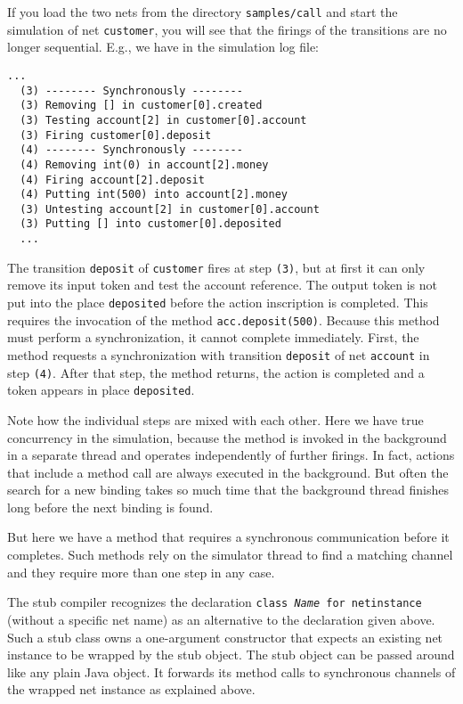 
If you load the two nets from the directory \texttt{samples/call}
and start the simulation of net
\texttt{customer}, you will see that the firings
of the transitions are no longer sequential. E.g., we have in the
simulation log file:
\begin{lstlisting}[style=xnonfloating]
  ...
  (3) -------- Synchronously --------
  (3) Removing [] in customer[0].created
  (3) Testing account[2] in customer[0].account
  (3) Firing customer[0].deposit
  (4) -------- Synchronously --------
  (4) Removing int(0) in account[2].money
  (4) Firing account[2].deposit
  (4) Putting int(500) into account[2].money
  (3) Untesting account[2] in customer[0].account
  (3) Putting [] into customer[0].deposited
  ...
\end{lstlisting}
The transition \texttt{deposit} of \texttt{customer} fires at
step \texttt{(3)}, but at first it can only remove its input token
and test the account reference. The output token is not put into the
place \texttt{deposited}
before the action inscription is completed. This requires
the invocation of the method \texttt{acc.deposit(500)}. Because
this method must perform a synchronization, it cannot complete
immediately. First, the method requests a synchronization
with transition \texttt{deposit} of net \texttt{account}
in step \texttt{(4)}. After that step, the method returns,
the action is completed and a token appears in place
\texttt{deposited}.

Note how the individual steps are mixed with each other.
Here we have true concurrency in the simulation, because the
method is invoked in the background in a separate thread
and operates independently of further firings. In fact, actions
that include a method call are
always executed in the background. But often
the search for a new binding takes so much time that the
background thread finishes long before the next binding is found.

But here we have a method that requires a synchronous communication
before it completes. Such methods rely on the simulator thread to
find a matching channel and they require more than one step
in any case.

The stub compiler recognizes the declaration \texttt{class
\emph{Name} for netinstance} (without a specific net name) as an
alternative to the declaration given above.
Such a stub class owns a one-argument constructor that expects an
existing net instance to be wrapped by the stub object.
The stub object can be passed around like any plain Java object.
It forwards its method calls to synchronous channels of the wrapped net
instance as explained above.
  

